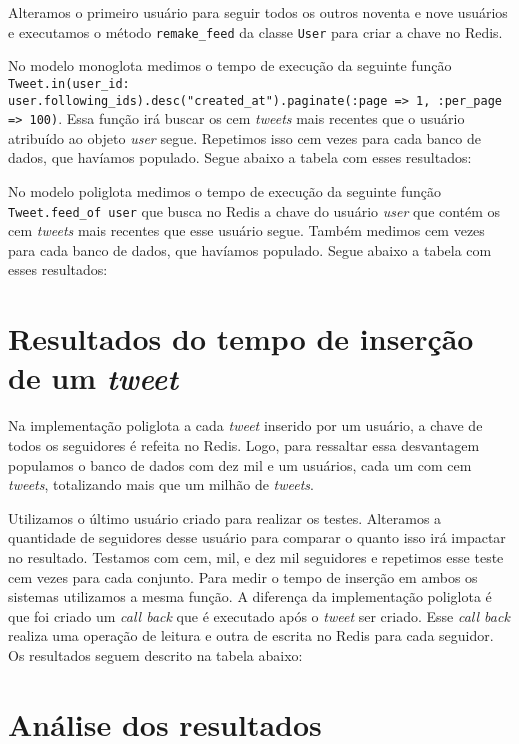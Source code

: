 Alteramos o primeiro usuário para seguir todos os outros noventa e nove usuários e executamos o método \verb|remake_feed| da classe \verb|User| para criar a chave no \ac{Redis}.

No modelo monoglota medimos o tempo de execução da seguinte função \verb|Tweet.in(user_id: user.following_ids).desc("created_at").paginate(:page => 1, :per_page => 100)|. Essa função irá buscar os cem \textit{tweets} mais recentes que o usuário atribuído ao objeto \textit{user} segue. Repetimos isso cem vezes para cada banco de dados, que havíamos populado. Segue abaixo a tabela com esses resultados:



No modelo poliglota medimos o tempo de execução da seguinte função \verb|Tweet.feed_of user| que busca no \ac{Redis} a chave do usuário \textit{user} que contém os cem \textit{tweets} mais recentes que esse usuário segue. Também medimos cem vezes para cada banco de dados, que havíamos populado. Segue abaixo a tabela com esses resultados:


\section{Resultados do tempo de inserção de um \textit{tweet}}
\label{sec:resultInsertTweet}
Na implementação poliglota a cada \textit{tweet} inserido por um usuário, a chave de todos os seguidores é refeita no \ac{Redis}. Logo, para ressaltar essa desvantagem populamos o banco de dados com dez mil e um usuários, cada um com cem \textit{tweets}, totalizando mais que um milhão de \textit{tweets}. 

Utilizamos o último usuário criado para realizar os testes. Alteramos a quantidade de seguidores desse usuário para comparar o quanto isso irá impactar no resultado. Testamos com cem, mil, e dez mil seguidores e repetimos esse teste cem vezes para cada conjunto. Para medir o tempo de inserção em ambos os sistemas utilizamos a mesma função. A diferença da implementação poliglota é que foi criado um \textit{call back} que é executado após o \textit{tweet} ser criado. Esse \textit{call back} realiza uma operação de leitura e outra de escrita no \ac{Redis} para cada seguidor. Os resultados seguem descrito na tabela abaixo:




\section{Análise dos resultados}
\label{sec:resultEval}

